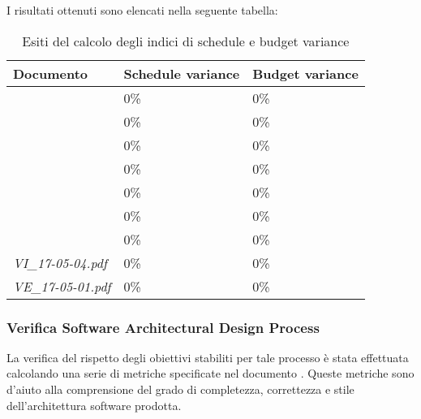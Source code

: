 		I risultati ottenuti sono elencati nella seguente tabella:	
		\begin{table}[H]
		\begin{tabular}{|l|l|l|}
		\hline
		\textbf{Documento} 		&\textbf{Schedule variance} &\textbf{Budget variance} 		\\
		\hline
		\PdQ 					&0\%		&0\%\\
		\NdP 					&0\%		&0\%\\
		\AdR 					&0\%		&0\%\\
		\PdP 					&0\%		&0\%\\
		\ST						&0\%		&0\%\\
		\DP						&0\%		&0\%\\
		\Glossario 				&0\%		&0\%\\
		\textit{VI_17-05-04.pdf} 		&0\%		&0\%\\
		\textit{VE_17-05-01.pdf} 		&0\%		&0\%\\
		\hline
		\end{tabular}
		\caption{Esiti del calcolo degli indici di schedule e budget variance}
		\end{table}

		\subsubsection{Verifica Software Architectural Design Process}
		La verifica del rispetto degli obiettivi stabiliti per tale processo è stata effettuata calcolando una serie di metriche specificate nel documento \NdP. Queste metriche sono d'aiuto alla comprensione del grado di completezza, correttezza e stile dell'architettura software prodotta.
		
